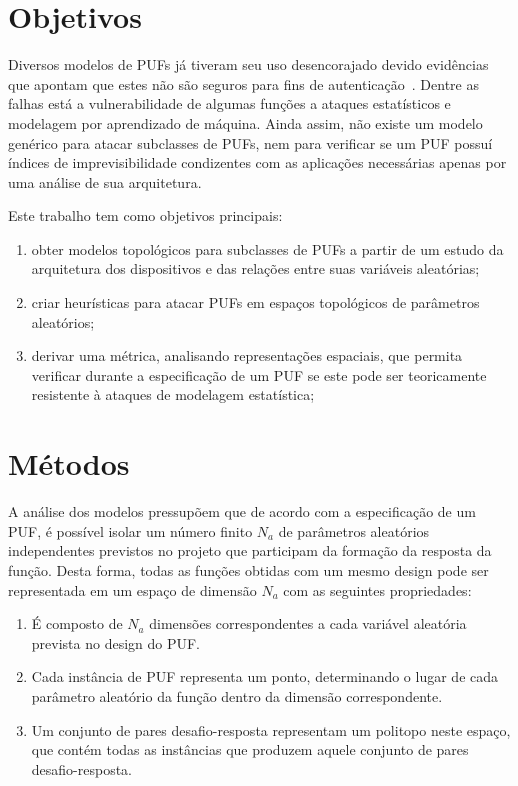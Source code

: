 \documentclass[pdftex,12pt]{article}
\begin{document}
\begin{spacing}{1.5}
\section{Objetivos}\label{sec:objetivos}

Diversos modelos de PUFs já tiveram seu uso desencorajado devido evidências que apontam que estes não são seguros para fins de autenticação~\cite{RuhrmairSSDDS10,RuhrmairD13}. Dentre as falhas está a vulnerabilidade de algumas funções a ataques estatísticos e modelagem por aprendizado de máquina. Ainda assim, não existe um modelo genérico para atacar subclasses de PUFs, nem para verificar se um PUF possuí índices de imprevisibilidade condizentes com as aplicações necessárias apenas por uma análise de sua arquitetura. 

Este trabalho tem como objetivos principais:
\begin{enumerate}
\item obter modelos topológicos para subclasses de PUFs a partir de um estudo da arquitetura dos dispositivos e das relações entre suas variáveis aleatórias;
\item criar heurísticas para atacar PUFs em espaços topológicos de parâmetros aleatórios;
\item derivar uma métrica, analisando representações espaciais, que permita verificar durante a especificação de um PUF se este pode ser teoricamente resistente à ataques de modelagem estatística;
\end{enumerate}


\section{Métodos}\label{sec:metodos}

A análise dos modelos pressupõem que de acordo com a especificação de um PUF, é possível isolar um número finito $N_a$ de parâmetros aleatórios independentes previstos no projeto que participam da formação da resposta da função. Desta forma, todas as funções obtidas com um mesmo design pode ser representada em um espaço de dimensão $N_a$ com as seguintes propriedades:

\begin{enumerate}
\item É composto de $N_a$ dimensões correspondentes a cada variável aleatória prevista no design do PUF. 
\item Cada instância de PUF representa um ponto, determinando o lugar de cada parâmetro aleatório da função dentro da dimensão correspondente.
\item Um conjunto de pares desafio-resposta representam um politopo neste espaço, que contém todas as instâncias que produzem aquele conjunto de pares desafio-resposta.
\end{enumerate}


\end{spacing}
\end{document}
